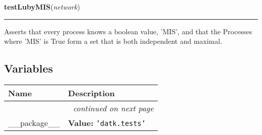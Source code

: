     \label{datk:tests:helpers:testLubyMIS}

    \vspace{0.5ex}

\hspace{.8\funcindent}\begin{boxedminipage}{\funcwidth}

    \raggedright \textbf{testLubyMIS}(\textit{network})

    \vspace{-1.5ex}

    \rule{\textwidth}{0.5\fboxrule}
\setlength{\parskip}{2ex}
    Asserts that every process knows a boolean value, 'MIS', and that the 
    Processes where 'MIS' is True form a set that is both independent and 
    maximal.

\setlength{\parskip}{1ex}
    \end{boxedminipage}



  \subsection{Variables}

    \vspace{-1cm}
\hspace{\varindent}\begin{longtable}{|p{\varnamewidth}|p{\vardescrwidth}|l}
\cline{1-2}
\cline{1-2} \centering \textbf{Name} & \centering \textbf{Description}& \\
\cline{1-2}
\endhead\cline{1-2}\multicolumn{3}{r}{\small\textit{continued on next page}}\\\endfoot\cline{1-2}
\endlastfoot\raggedright \_\-\_\-p\-a\-c\-k\-a\-g\-e\-\_\-\_\- & \raggedright \textbf{Value:} 
{\tt \texttt{'}\texttt{datk.tests}\texttt{'}}&\\
\cline{1-2}
\end{longtable}

